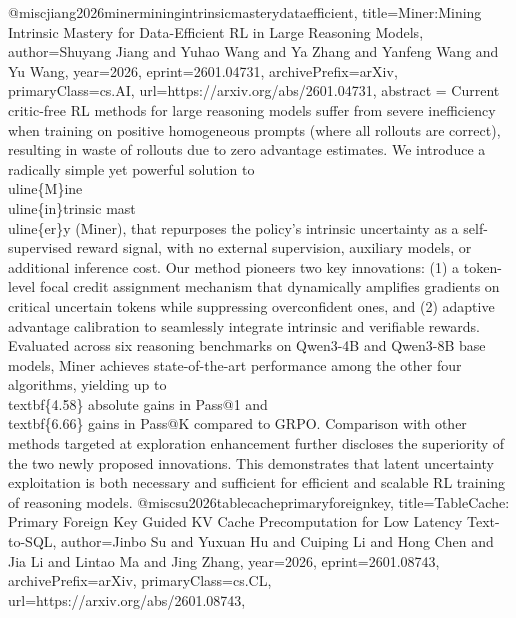 {}@misc{jiang2026minerminingintrinsicmasterydataefficient,
      title={Miner:Mining Intrinsic Mastery for Data-Efficient RL in Large Reasoning Models}, 
      author={Shuyang Jiang and Yuhao Wang and Ya Zhang and Yanfeng Wang and Yu Wang},
      year={2026},
      eprint={2601.04731},
      archivePrefix={arXiv},
      primaryClass={cs.AI},
      url={https://arxiv.org/abs/2601.04731},
      abstract = {Current critic-free RL methods for large reasoning models suffer from severe inefficiency when training on positive homogeneous prompts (where all rollouts are correct), resulting in waste of rollouts due to zero advantage estimates. We introduce a radically simple yet powerful solution to \\uline\{M\}ine \\uline\{in\}trinsic mast\\uline\{er\}y (Miner), that repurposes the policy's intrinsic uncertainty as a self-supervised reward signal, with no external supervision, auxiliary models, or additional inference cost. Our method pioneers two key innovations: (1) a token-level focal credit assignment mechanism that dynamically amplifies gradients on critical uncertain tokens while suppressing overconfident ones, and (2) adaptive advantage calibration to seamlessly integrate intrinsic and verifiable rewards. Evaluated across six reasoning benchmarks on Qwen3-4B and Qwen3-8B base models, Miner achieves state-of-the-art performance among the other four algorithms, yielding up to \\textbf\{4.58\} absolute gains in Pass@1 and \\textbf\{6.66\} gains in Pass@K compared to GRPO. Comparison with other methods targeted at exploration enhancement further discloses the superiority of the two newly proposed innovations. This demonstrates that latent uncertainty exploitation is both necessary and sufficient for efficient and scalable RL training of reasoning models.}
}@misc{su2026tablecacheprimaryforeignkey,
      title={TableCache: Primary Foreign Key Guided KV Cache Precomputation for Low Latency Text-to-SQL}, 
      author={Jinbo Su and Yuxuan Hu and Cuiping Li and Hong Chen and Jia Li and Lintao Ma and Jing Zhang},
      year={2026},
      eprint={2601.08743},
      archivePrefix={arXiv},
      primaryClass={cs.CL},
      url={https://arxiv.org/abs/2601.08743},
}
